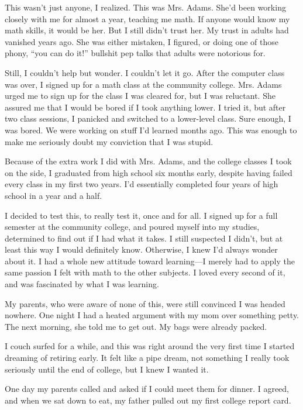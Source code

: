 This wasn't just anyone, I realized. This was Mrs. Adams. She'd been working closely with me for almost a year, teaching me math. If anyone would know my math skills, it would be her. But I still didn't trust her. My trust in adults had vanished years ago. She was either mistaken, I figured, or doing one of those phony, ``you can do it!'' bullshit pep talks that adults were notorious for.

Still, I couldn't help but wonder. I couldn't let it go. After the computer class was over, I signed up for a math class at the community college. Mrs. Adams urged me to sign up for the class I was cleared for, but I was reluctant. She assured me that I would be bored if I took anything lower. I tried it, but after two class sessions, I panicked and switched to a lower-level class. Sure enough, I was bored. We were working on stuff I'd learned months ago. This was enough to make me seriously doubt my conviction that I was stupid.

Because of the extra work I did with Mrs. Adams, and the college classes I took on the side, I graduated from high school six months early, despite having failed every class in my first two years. I'd essentially completed four years of high school in a year and a half.

I decided to test this, to really test it, once and for all. I signed up for a full semester at the community college, and poured myself into my studies, determined to find out if I had what it takes. I still suspected I didn't, but at least this way I would definitely know. Otherwise, I knew I'd always wonder about it. I had a whole new attitude toward learning---I merely had to apply the same passion I felt with math to the other subjects. I loved every second of it, and was fascinated by what I was learning.

My parents, who were aware of none of this, were still convinced I was headed nowhere. One night I had a heated argument with my mom over something petty. The next morning, she told me to get out. My bags were already packed.

I couch surfed for a while, and this was right around the very first time I started dreaming of retiring early. It felt like a pipe dream, not something I really took seriously until the end of college, but I knew I wanted it.

One day my parents called and asked if I could meet them for dinner. I agreed, and when we sat down to eat, my father pulled out my first college report card.

